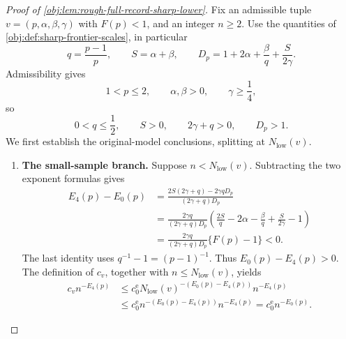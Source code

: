 \begin{proof}[Proof of \cref{obj:lem:rough-full-record-sharp-lower}]
Fix an admissible tuple \(v=(p,\alpha,\beta,\gamma)\) with \(F(p)<1\), and an integer \(n\ge2\). Use the quantities of \cref{obj:def:sharp-frontier-scales}, in particular
\[
q=\frac{p-1}{p},
\qquad S=\alpha+\beta,
\qquad
D_p=1+2\alpha+\frac{\beta}{q}+\frac{S}{2\gamma}.
\]
Admissibility gives
\[
1<p\le2,\qquad \alpha,\beta>0,\qquad \gamma\ge\frac14,
\]
so
\[
0<q\le\frac12,\qquad S>0,\qquad
2\gamma+q>0,\qquad D_p>1.
\]
We first establish the original-model conclusions, splitting at \(N_{\mathrm{low}}(v)\).

\begin{enumerate}
\item \textbf{The small-sample branch.}
Suppose \(n<N_{\mathrm{low}}(v)\). Subtracting the two exponent formulas gives
\[
\begin{aligned}
E_4(p)-E_0(p)
&=
\frac{2S(2\gamma+q)-2\gamma qD_p}
     {(2\gamma+q)D_p}\\
&=
\frac{2\gamma q}{(2\gamma+q)D_p}
\left(
\frac{2S}{q}-2\alpha-\frac{\beta}{q}
+\frac{S}{2\gamma}-1
\right)\\
&=
\frac{2\gamma q}{(2\gamma+q)D_p}\{F(p)-1\}<0.
\end{aligned}
\]
The last identity uses \(q^{-1}-1=(p-1)^{-1}\). Thus \(E_0(p)-E_4(p)>0\). The definition of \(c_v\), together with \(n\le N_{\mathrm{low}}(v)\), yields
\[
\begin{aligned}
c_vn^{-E_4(p)}
&\le
c_0^{\mathrm e}
N_{\mathrm{low}}(v)^{-(E_0(p)-E_4(p))}
n^{-E_4(p)}\\
&\le
c_0^{\mathrm e}
n^{-(E_0(p)-E_4(p))}n^{-E_4(p)}
=
c_0^{\mathrm e}n^{-E_0(p)}.
\end{aligned}
\]


\end{enumerate}
\end{proof}
